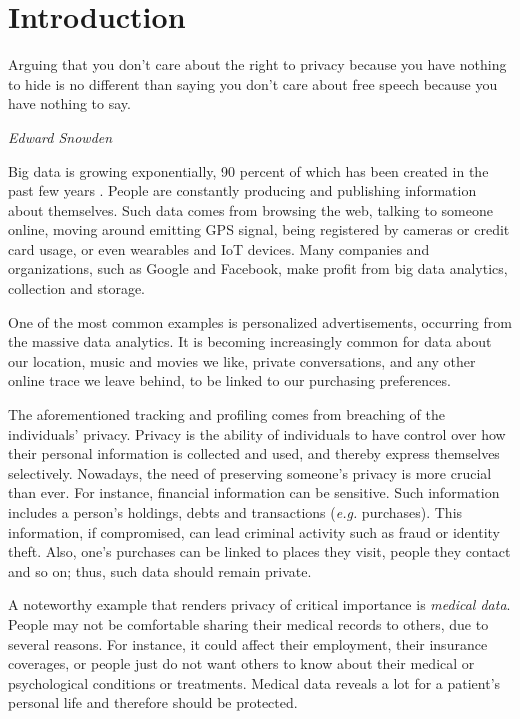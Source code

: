 \chapter{Introduction}\label{c:introduction}

\epigraph{Arguing that you don't care about the right to privacy because you have nothing to hide is no different than saying you don't care about free speech because you have nothing to say.}{\textit{Edward Snowden \cite{snowden15}}}


Big data is growing exponentially, 90 percent of which has been created in the past few years \cite{kim2014big}.
People are constantly producing and publishing information about themselves.
Such data comes from browsing the web, talking to someone online, moving around emitting GPS signal, being registered by cameras or credit card usage, or even wearables and IoT devices.
Many companies and organizations, such as Google and Facebook, make profit from big data analytics, collection and storage.

One of the most common examples is personalized advertisements, occurring from the massive data analytics.
It is becoming increasingly common for data about our location, music and movies we like, private conversations, and any other online trace we leave behind, to be linked to our purchasing preferences.

The aforementioned tracking and profiling comes from breaching of the individuals’ privacy.
Privacy is the ability of individuals to have control over how their personal information is collected and used, and thereby express themselves selectively.
Nowadays, the need of preserving someone's privacy is more crucial than ever.
For instance, financial information can be sensitive.
Such information includes a person’s holdings, debts and transactions (\textit{e.g.} purchases).
This information, if compromised, can lead criminal activity such as fraud or identity theft.
Also, one’s purchases can be linked to places they visit, people they contact and so on; thus, such data should remain private.

A noteworthy example that renders privacy of critical importance is \emph{medical data}.
People may not be comfortable sharing their medical records to others, due to several reasons.
For instance, it could affect their employment, their insurance coverages, or people just do not want others to know about their medical or psychological conditions or treatments.
Medical data reveals a lot for a patient’s personal life and therefore should be protected.

